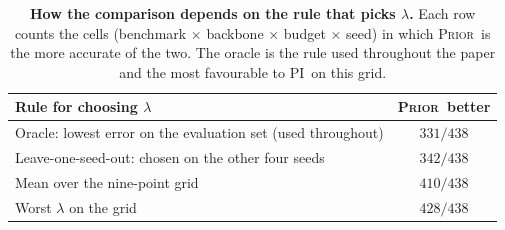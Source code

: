 \documentclass{article}
\newcommand{\armpi}{\textsc{PI}}
\newcommand{\armprior}{\textsc{Prior}}
\begin{document}
\begin{table}[t]
\centering
\caption{\textbf{How the comparison depends on the rule that picks $\lambda$.} Each row counts the
cells (benchmark $\times$ backbone $\times$ budget $\times$ seed) in which \armprior\ is the more
accurate of the two. The oracle is the rule used throughout the paper and the most favourable to
\armpi\ on this grid.}
\label{tab:app-oracle}
\footnotesize
\setlength{\tabcolsep}{40pt}
\renewcommand{\arraystretch}{0.7}
\begin{tabular}{@{}lc@{}}
\toprule
Rule for choosing $\lambda$ & \armprior\ better\\
\midrule
Oracle: lowest error on the evaluation set (used throughout) & $331/438$\\
Leave-one-seed-out: chosen on the other four seeds & $342/438$\\
Mean over the nine-point grid & $410/438$\\
Worst $\lambda$ on the grid & $428/438$\\
\bottomrule
\end{tabular}
  \vspace{-3mm}
\end{table}
\end{document}
